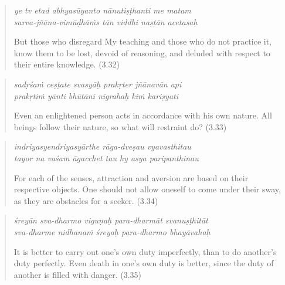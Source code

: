 \documentclass[12pt, twoside, openright]{memoir}
\begin{document}
\par
\begin{verse}
\textit{ye tv etad abhyasūyanto nānutiṣṭhanti me matam} \\
\textit{sarva-jñāna-vimūḍhāṁs tān viddhi naṣṭān acetasaḥ}

\noindent But those who disregard My teaching and those who do not practice it, know them to be lost, devoid of reasoning, and deluded with respect to their entire knowledge. (3.32)
\end{verse}
\par



\par
\begin{verse}
\textit{sadṛśaṁ ceṣṭate svasyāḥ prakṛter jñānavān api} \\
\textit{prakṛtiṁ yānti bhūtāni nigrahaḥ kiṁ kariṣyati}

\noindent Even an enlightened person acts in accordance with his own nature. All beings follow their nature, so what will restraint do? (3.33)
\end{verse}
\par



\par
\begin{verse}
\textit{indriyasyendriyasyārthe rāga-dveṣau vyavasthitau} \\
\textit{tayor na vaśam āgacchet tau hy asya paripanthinau}

\noindent For each of the senses, attraction and aversion are based on their respective objects. One should not allow oneself to come under their sway, as they are obstacles for a seeker. (3.34)
\end{verse}
\par



\par
\begin{verse}
\textit{śreyān sva-dharmo viguṇaḥ para-dharmāt svanuṣṭhitāt} \\
\textit{sva-dharme nidhanaṁ śreyaḥ para-dharmo bhayāvahaḥ}

\noindent It is better to carry out one’s own duty imperfectly, than to do another's duty perfectly. Even death in one’s own duty is better, since the duty of another is filled with danger. (3.35)
\end{verse}
\par
\end{document}
